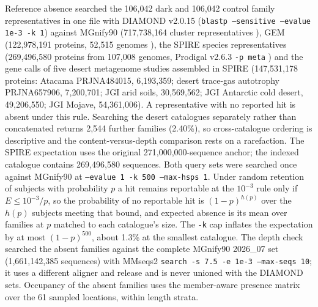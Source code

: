 \documentclass[11pt]{article}
\begin{document}
Reference absence searched the 106{,}042 dark and 106{,}042 control family representatives in one
file with DIAMOND v2.0.15 (\texttt{blastp --sensitive --evalue 1e-3 -k 1}) against MGnify90
(717{,}738{,}164 cluster representatives \citep{richardson2023mgnify}), GEM (122{,}978{,}191
proteins, 52{,}515 genomes \citep{nayfach2021gem}), the SPIRE species representatives (269{,}496{,}580
proteins from 107{,}008 genomes, Prodigal v2.6.3 \texttt{-p meta} \citep{schmidt2024spire}) and the
gene calls of five desert metagenome studies assembled in SPIRE (147{,}531{,}178 proteins: Atacama
PRJNA484015, 6{,}193{,}359; desert trace-gas autotrophy PRJNA657906, 7{,}200{,}701; JGI arid soils,
30{,}569{,}562; JGI Antarctic cold desert, 49{,}206{,}550; JGI Mojave, 54{,}361{,}006). A
representative with no reported hit is absent under this rule. Searching the desert catalogues
separately rather than concatenated returns 2{,}544 further families (2.40\%), so cross-catalogue
ordering is descriptive and the content-versus-depth comparison rests on a rarefaction. The SPIRE expectation uses the original 271{,}000{,}000-sequence anchor; the indexed catalogue contains 269{,}496{,}580 sequences. Both query
sets were searched once against MGnify90 at \texttt{--evalue 1 -k 500 --max-hsps 1}. Under random
retention of subjects with probability $p$ a hit remains reportable at the $10^{-3}$ rule only if
$E \leq 10^{-3}/p$, so the probability of no reportable hit is $(1-p)^{h(p)}$ over the $h(p)$ subjects
meeting that bound, and expected absence is its mean over families at $p$ matched to each catalogue's
size. The \texttt{-k} cap inflates the expectation by at most $(1-p)^{500}$, about 1.3\% at the
smallest catalogue. The depth check searched the absent families against the complete MGnify90
2026\_07 set (1{,}661{,}142{,}385 sequences) with MMseqs2 \texttt{search -s 7.5 -e 1e-3 --max-seqs 10};
it uses a different aligner and release and is never unioned with the DIAMOND sets. Occupancy of the
absent families uses the member-aware presence matrix over the 61 sampled locations, within length strata.
\end{document}
